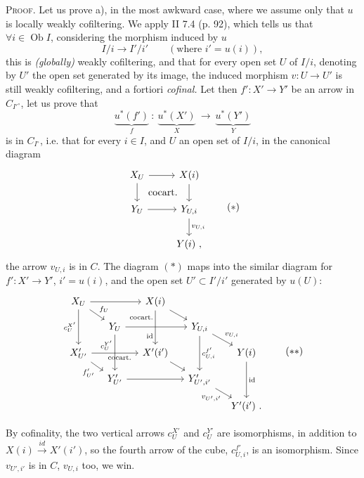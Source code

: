 \textsc{Proof}. Let us prove a), in the most awkward case, where we assume only that $u$ is locally weakly cofiltering. We apply II 7.4 (p. 92), which tells us that $\forall i\in\operatorname{Ob}I$,
considering the morphism induced by $u$
\[
I/i \longrightarrow I'/i' \qquad (\text{where } i'=u(i)),
\]
this is \textit{(globally)} weakly cofiltering, and that for every open set $U$ of $I/i$, denoting by $U'$ the open set generated by its image, the induced morphism $v:U\longrightarrow U'$ is still weakly cofiltering, and a fortiori \textit{cofinal.} Let then $f':X'\longrightarrow Y'$ be an arrow in $C_{I'^\circ}$, let us prove that
\[
\underbrace{u^*(f')}_{f}\ :\ \underbrace{u^*(X')}_{X}\ \longrightarrow\ \underbrace{u^*(Y')}_{Y}
\]
is in $C_{I^\circ}$, i.e. that for every $i\in I$, and $U$ an open set of $I/i$, in the canonical diagram
\[
\begin{tikzcd}
X_U \arrow[r] \arrow[d] \arrow[dr, phantom, "\text{cocart.}"] & X(i) \arrow[d] \\
Y_U \arrow[r] & Y_{U,i} \arrow[d, "v_{U,i}"] \\
& Y(i)\ ,
\end{tikzcd}
\tag*{$(*)$}
\]
the arrow $v_{U,i}$ is in $C$. The diagram $(*)$ maps into the similar diagram for $f':X'\longrightarrow Y'$, $i'=u(i)$, and the open set $U'\subset I'/i'$ generated by $u(U)$:
\[
\begin{tikzcd}[column sep=small, row sep=small]
X_U \arrow[rr] \arrow[dr, "f_U"] \arrow[dd, "c_U^{X'}"'] & & X(i) \arrow[dr] \arrow[dd, "\text{cocart.}"' {pos=0.2}, "\mathrm{id}"' {pos=0.75}] & & \\
& Y_U \arrow[rr] \arrow[dd, "c_U^{Y'}"' {pos=0.3}] & & Y_{U,i} \arrow[dr, "v_{U,i}"] \arrow[dd, "c^{f'}_{U,i}"] & \\
X'_{U'} \arrow[rr, "\text{cocart.}"' {pos=0.6}] \arrow[dr, "f'_{U'}"'] & & X'(i') \arrow[dr] & & Y(i) \arrow[dd, "\mathrm{id}"] \\
& Y'_{U'} \arrow[rr] & & Y'_{U',i'} \arrow[dr, "v_{U',i'}"'] & \\
& & & & Y'(i')\ .
\end{tikzcd}
\tag*{$(**)$}
\]

By cofinality, the two vertical arrows $c_U^{X'}$ and $c_U^{Y'}$ are isomorphisms, in addition to $X(i)\xrightarrow{\ id\ }X'(i')$, so the fourth arrow of the cube, $c^{f'}_{U,i}$, is an isomorphism. Since $v_{U',i'}$ is in $C$, $v_{U,i}$ too, we win.

